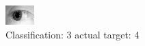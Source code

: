 \begin{figure}[h!]
\begin{center}
\includegraphics[width=0.60\columnwidth]{figures/ID1214_class_3_target_4.png}
\end{center}
\caption{ Classification: 3 actual target: 4}
\label{fig:ID1214_class_3_target_4}
\end{figure}
